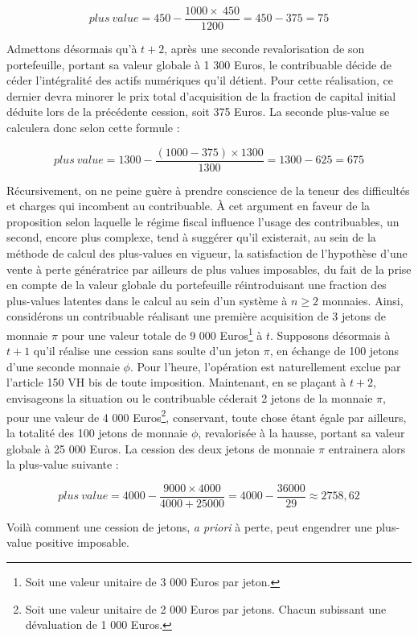 {\[  plus\ value = 450 - \frac{1000  \times\  450}{1200} = 450 - 375 = 75 \]

Admettons désormais qu'à $t+2$, après une seconde revalorisation de son portefeuille, portant sa valeur globale à 1 300 Euros, le contribuable décide de céder l'intégralité des actifs numériques qu'il détient. Pour cette réalisation, ce dernier devra minorer le prix total d'acquisition de la fraction de capital initial déduite lors de la précédente cession, soit 375 Euros. La seconde plus-value se calculera donc selon cette formule :

\[  plus\ value = 1300 - \frac{(1000-375) \times{}  1300}{1300} = 1300 - 625 = 675 \]

Récursivement, on ne peine guère à prendre conscience de la teneur des difficultés et charges qui incombent au contribuable. À cet argument en faveur de la proposition selon laquelle le régime fiscal influence l'usage des contribuables, un second, encore plus complexe, tend à suggérer qu'il existerait, au sein de la méthode de calcul des plus-values en vigueur, la satisfaction de l'hypothèse d'une vente à perte génératrice par ailleurs de plus values imposables, du fait de la prise en compte de la valeur globale du portefeuille réintroduisant une fraction des plus-values latentes dans le calcul au sein d'un système à $n \geq 2$ monnaies. Ainsi, considérons un contribuable réalisant une première acquisition de 3 jetons de monnaie $\pi$ pour une valeur totale de 9 000 Euros\footnote{Soit une valeur unitaire de 3 000 Euros par jeton.} à $t$. Supposons désormais à $t+1$ qu'il réalise une cession sans soulte d'un jeton $\pi$, en échange de 100 jetons d'une seconde monnaie $\phi$. Pour l'heure, l'opération est naturellement exclue par l'article 150 VH bis de toute imposition. Maintenant, en se plaçant à $t+2$, envisageons la situation ou le contribuable céderait 2 jetons de la monnaie $\pi$, pour une valeur de 4 000 Euros\footnote{Soit une valeur unitaire de 2 000 Euros par jetons. Chacun subissant une dévaluation de 1 000 Euros.}, conservant, toute chose étant égale par ailleurs, la totalité des 100 jetons de monnaie $\phi$, revalorisée à la hausse, portant sa valeur globale à 25 000 Euros. La cession des deux jetons de monnaie $\pi$ entrainera alors la plus-value suivante :

\[  plus\ value = 4000 - \frac{9000 \times{} 4000}{4000 + 25 000} = 4000 - \frac{36000}{29} \approx 2758,62 \]

Voilà comment une cession de jetons, \emph{a priori} à perte, peut engendrer une plus-value positive imposable.\par

}
